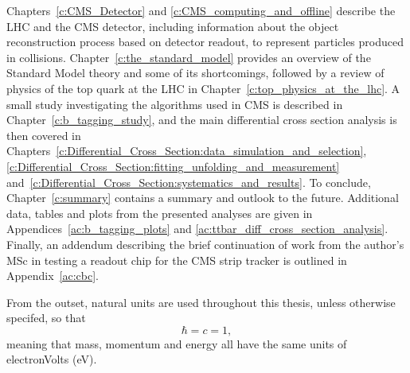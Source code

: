 Chapters~\ref{c:CMS_Detector} and \ref{c:CMS_computing_and_offline} describe the LHC and the CMS detector,
including information about the object reconstruction process based on detector readout, to represent
particles produced in collisions. Chapter~\ref{c:the_standard_model} provides an overview of the Standard
Model theory and some of its shortcomings, followed by a review of physics of the top quark at the LHC in
Chapter~\ref{c:top_physics_at_the_lhc}. A small study investigating the \btagging algorithms used in CMS is
described in Chapter~\ref{c:b_tagging_study}, and the main \ttbar differential cross section analysis is then
covered in Chapters~\ref{c:Differential_Cross_Section:data_simulation_and_selection},
\ref{c:Differential_Cross_Section:fitting_unfolding_and_measurement}
and~\ref{c:Differential_Cross_Section:systematics_and_results}. To conclude, Chapter~\ref{c:summary} contains
a summary and outlook to the future. Additional data, tables and plots from the presented analyses are given
in Appendices~\ref{ac:b_tagging_plots} and \ref{ac:ttbar_diff_cross_section_analysis}. Finally, an addendum
describing the brief continuation of work from the author's MSc in testing a readout chip for the CMS strip
tracker is outlined in Appendix~\ref{ac:cbc}.

From the outset, natural units are used throughout this thesis, unless otherwise specifed, so that
\begin{equation}
\hbar = c = 1,
\end{equation}
meaning that mass, momentum and energy all have the same units of electronVolts (eV).